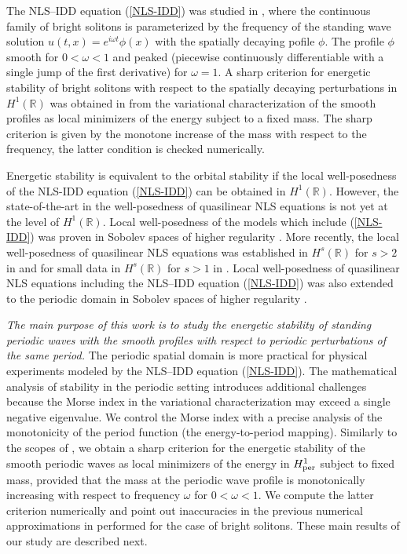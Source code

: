\documentclass[12pt,reqno]{amsart}
\newcommand{\R}{{\mathbb R}}
\numberwithin{equation}{section}
\numberwithin{figure}{section}
\begin{document}
The NLS--IDD equation (\ref{NLS-IDD}) was studied in \cite{KPR24}, where the continuous family of bright solitons is parameterized by the frequency of the standing wave solution $u(t,x) = e^{i \omega t} \phi(x)$ with the spatially decaying pofile $\phi$. The profile $\phi$ smooth for $0 < \omega < 1$ and peaked (piecewise continuously differentiable with a single jump of the first derivative) for $\omega = 1$. A sharp criterion for energetic stability of bright solitons with respect to the spatially decaying perturbations in $H^1(\R)$ was obtained in \cite{KPR24} from 
the variational characterization of the smooth profiles as local minimizers of the energy subject to a fixed mass. The sharp criterion is given by the monotone increase of the mass with respect to the frequency, the latter condition is checked numerically. 

Energetic stability is equivalent to the orbital stability if the local 
well-posedness of the NLS-IDD equation (\ref{NLS-IDD}) can be obtained in $H^1(\R)$. However, the state-of-the-art in the well-posedness of quasilinear NLS equations is not yet at the level of $H^1(\R)$. Local well-posedness of the models which include (\ref{NLS-IDD}) was proven in Sobolev spaces of higher regularity \cite{KPV03,Marzuola1,Popen}. More recently, the local well-posedness of quasilinear NLS equations was established in $H^s(\R)$ for $s > 2$ in \cite{Marzuola} and for small data in $H^s(\R)$ for $s > 1$ in \cite{Ifrim}. 
Local well-posedness of quasilinear NLS equations including the NLS--IDD equation (\ref{NLS-IDD}) was also extended to the periodic domain in Sobolev spaces of higher regularity \cite{Feola1,Feola2,Feola}.

{\em The main purpose of this work is to study the energetic stability 
of standing periodic waves with the smooth profiles with respect to periodic perturbations of the same period. }
The periodic spatial domain is more practical for physical experiments modeled by the NLS--IDD equation (\ref{NLS-IDD}). 
The mathematical analysis of stability in the periodic setting introduces additional challenges because the Morse index in the variational characterization may exceed a single negative eigenvalue. We control the Morse index with a precise analysis of the monotonicity of the period function (the energy-to-period mapping). 
Similarly to the scopes of \cite{KPR24}, we obtain a sharp criterion for the energetic stability of the smooth periodic waves as local minimizers of the 
energy in $H^1_{\rm per}$ subject to fixed mass, provided that the mass 
at the periodic wave profile is monotonically increasing with respect to 
frequency $\omega$ for $0 < \omega < 1$. We compute the latter criterion numerically and point out inaccuracies in the previous numerical approximations in \cite{KPR24} performed for the case of bright solitons. These main results of our study are described next.
\end{document}
